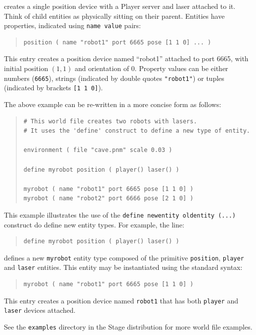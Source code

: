 \documentclass[11pt]{report}
\begin{document}
creates a single position device with a Player server and laser attached to
it.  Think of child entities as physically sitting on their parent.
%
Entities have properties, indicated using \verb'name value' pairs:
\begin{quote}
\begin{verbatim}
position ( name "robot1" port 6665 pose [1 1 0] ... )
\end{verbatim}
\end{quote}
This entry creates a position device named ``robot1'' attached to port
6665, with initial position $(1, 1)$ and orientation of $0$.  Property
values can be either numbers (\verb'6665'), strings (indicated by
double quotes \verb'"robot1"') or tuples (indicated by brackets
\verb'[1 1 0]').

The above example can be re-written in a more concise form as follows:
\begin{quote}
\begin{verbatim}
# This world file creates two robots with lasers.
# It uses the 'define' construct to define a new type of entity.

environment ( file "cave.pnm" scale 0.03 )

define myrobot position ( player() laser() )

myrobot ( name "robot1" port 6665 pose [1 1 0] )
myrobot ( name "robot2" port 6666 pose [2 1 0] )
\end{verbatim}
\end{quote}
This example illustrates the use of the \verb'define newentity oldentity (...)'
construct do define new entity types.  For example, the line:
\begin{quote}
\begin{verbatim}
define myrobot position ( player() laser() )
\end{verbatim}
\end{quote}
defines a new \verb'myrobot' entity type composed of the
primitive \verb'position', \verb'player' and \verb'laser' entities.
This entity may be instantiated using the standard syntax:
\begin{quote}
\begin{verbatim}
myrobot ( name "robot1" port 6665 pose [1 1 0] )
\end{verbatim}
\end{quote}
This entry creates a position device named \verb'robot1' that has
both \verb'player' and \verb'laser' devices attached.

See the {\tt examples} directory in the Stage distribution for more
world file examples.
\end{document}
